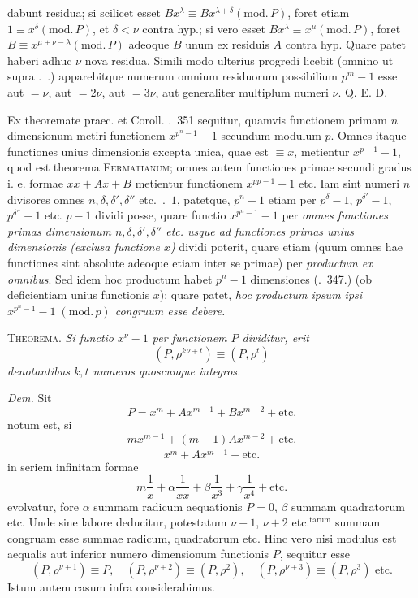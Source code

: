 %
dabunt residua; si scilicet esset $Bx^\lambda\equiv Bx^{\lambda+\delta}(\mathrm{mod.}\,P)$, foret etiam $1\equiv x^\delta(\mathrm{mod.}\,P)$, et $\delta<\nu$ contra hyp.; si vero esset $Bx^\lambda\equiv x^\mu(\mathrm{mod.}\,P)$, foret $B\equiv x^{\mu+\nu-\lambda}(\mathrm{mod.}\,P)$ adeoque $B$ unum ex residuis $A$ contra hyp. Quare patet haberi adhuc $\nu$ nova residua. Simili modo ulterius progredi licebit (omnino ut supra \textsection.\ .) apparebitque numerum omnium residuorum possibilium $p^m-1$ esse aut $=\nu$, aut $=2\nu$, aut $=3\nu$, aut generaliter multiplum numeri $\nu$. Q. E. D.

Ex theoremate praec. et Coroll. \textsection.\ 351 sequitur, quamvis functionem primam $n$ dimensionum metiri functionem $x^{p^n-1}-1$ secundum modulum $p$. Omnes itaque functiones unius dimensionis excepta unica, quae est $\equiv x$, metientur $x^{p-1}-1$, quod est theorema \textsc{Fermatianum}; omnes autem functiones primae secundi gradus i. e. formae $xx+Ax+B$ metientur functionem $x^{pp-1}-1$ etc. Iam sint numeri $n$ divisores omnes $n,\delta,\delta',\delta''$ etc.\ .\ $1$, patetque, $p^n-1$ etiam per $p^\delta-1$, $p^{\delta'}-1$, $p^{\delta''}-1$ etc. $p-1$ dividi posse, quare functio $x^{p^n-1}-1$ per \emph{omnes functiones primas dimensionum $n,\delta,\delta',\delta''$ etc. usque ad functiones primas unius dimensionis (exclusa functione $x$)} dividi poterit, quare etiam (quum omnes hae functiones sint absolute adeoque etiam inter se primae) per \emph{productum ex omnibus}. Sed idem hoc productum habet $p^n-1$ dimensiones (\textsection.\ 347.) (ob deficientiam unius functionis $x$); quare patet, \emph{hoc productum ipsum ipsi $x^{p^n-1}-1\;(\mathrm{mod.}\,p)$ congruum esse debere.}

\textsc{Theorema.} \emph{Si functio $x^\nu-1$ per functionem $P$ dividitur, erit}
\[
(P,\rho^{k\nu+t})\equiv(P,\rho^t)
\]
\emph{denotantibus $k,t$ numeros quoscunque integros.}

\emph{Dem.} Sit
\[
P=x^m+Ax^{m-1}+Bx^{m-2}+\text{etc.}
\]
notum est, si
\[
\frac{mx^{m-1}+(m-1)Ax^{m-2}+\text{etc.}}{x^m+Ax^{m-1}+\text{etc.}}
\]
in seriem infinitam formae
\[
m\frac1x+\alpha\frac1{xx}+\beta\frac1{x^3}+\gamma\frac1{x^4}+\text{etc.}
\]
%
evolvatur, fore $\alpha$ summam radicum aequationis $P=0$, $\beta$ summam quadratorum etc. Unde sine labore deducitur, potestatum $\nu+1$, $\nu+2$ etc.$^{\mathrm{tarum}}$ summam congruam esse summae radicum, quadratorum etc. Hinc vero nisi modulus est aequalis aut inferior numero dimensionum functionis $P$, sequitur esse
\[
(P,\rho^{\nu+1})\equiv P,\quad(P,\rho^{\nu+2})\equiv(P,\rho^2),\quad(P,\rho^{\nu+3})\equiv(P,\rho^3)\text{ etc.}
\]
Istum autem casum infra considerabimus.

